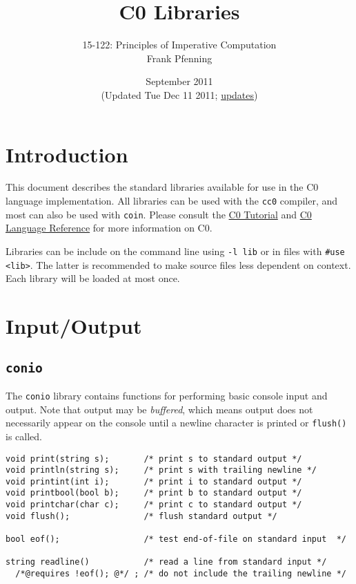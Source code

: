 \documentclass[11pt]{article}
\title{C0 Libraries}
\author{15-122: Principles of Imperative Computation \\ Frank Pfenning}
\date{September 2011\\(Updated Tue Dec 11 2011;
  \hyperlink{sec:updates}{updates})}
\begin{document}
\maketitle

\section{Introduction}

This document describes the standard libraries available for use
in the C0 language implementation.  All libraries can be used
with the \verb'cc0' compiler, and most can also be used with
\verb'coin'.   Please consult the
\href{http://c0.typesafety.net/tutorial}{C0 Tutorial} and
\href{http://c0.typesafety.net/doc/c0-reference.pdf}{C0 Language
Reference} for more information on C0.

Libraries can be include on the command line using \verb'-l lib' or in
files with \verb'#use <lib>'.  The latter is recommended to make
source files less dependent on context.  Each library will be loaded
at most once.

\section{Input/Output}

\subsection{\tt conio}

The \verb'conio' library contains functions for performing basic
console input and output.  Note that output may be \emph{buffered},
which means output does not necessarily appear on the console
until a newline character is printed or \verb'flush()' is called.

\begin{small}
\begin{verbatim}
void print(string s);       /* print s to standard output */
void println(string s);     /* print s with trailing newline */
void printint(int i);       /* print i to standard output */
void printbool(bool b);     /* print b to standard output */
void printchar(char c);     /* print c to standard output */
void flush();               /* flush standard output */

bool eof();                 /* test end-of-file on standard input  */

string readline()           /* read a line from standard input */
  /*@requires !eof(); @*/ ; /* do not include the trailing newline */
\end{verbatim}
\end{small}
\end{document}
